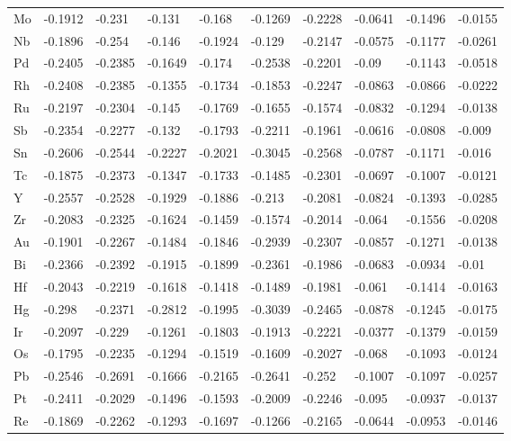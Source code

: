 \begin{table}[h]
{\begin{tabular}{*{10}{l}}
      Mo & -0.1912 & -0.231  & -0.131  & -0.168  & -0.1269 & -0.2228 & -0.0641 & -0.1496 & -0.0155 \\
      Nb & -0.1896 & -0.254  & -0.146  & -0.1924 & -0.129  & -0.2147 & -0.0575 & -0.1177 & -0.0261 \\
      Pd & -0.2405 & -0.2385 & -0.1649 & -0.174  & -0.2538 & -0.2201 & -0.09   & -0.1143 & -0.0518 \\
      Rh & -0.2408 & -0.2385 & -0.1355 & -0.1734 & -0.1853 & -0.2247 & -0.0863 & -0.0866 & -0.0222 \\
      Ru & -0.2197 & -0.2304 & -0.145  & -0.1769 & -0.1655 & -0.1574 & -0.0832 & -0.1294 & -0.0138 \\
      Sb & -0.2354 & -0.2277 & -0.132  & -0.1793 & -0.2211 & -0.1961 & -0.0616 & -0.0808 & -0.009  \\
      Sn & -0.2606 & -0.2544 & -0.2227 & -0.2021 & -0.3045 & -0.2568 & -0.0787 & -0.1171 & -0.016  \\
      Tc & -0.1875 & -0.2373 & -0.1347 & -0.1733 & -0.1485 & -0.2301 & -0.0697 & -0.1007 & -0.0121 \\
      Y  & -0.2557 & -0.2528 & -0.1929 & -0.1886 & -0.213  & -0.2081 & -0.0824 & -0.1393 & -0.0285 \\
      Zr & -0.2083 & -0.2325 & -0.1624 & -0.1459 & -0.1574 & -0.2014 & -0.064  & -0.1556 & -0.0208 \\
      Au & -0.1901 & -0.2267 & -0.1484 & -0.1846 & -0.2939 & -0.2307 & -0.0857 & -0.1271 & -0.0138 \\
      Bi & -0.2366 & -0.2392 & -0.1915 & -0.1899 & -0.2361 & -0.1986 & -0.0683 & -0.0934 & -0.01   \\
      Hf & -0.2043 & -0.2219 & -0.1618 & -0.1418 & -0.1489 & -0.1981 & -0.061  & -0.1414 & -0.0163 \\
      Hg & -0.298  & -0.2371 & -0.2812 & -0.1995 & -0.3039 & -0.2465 & -0.0878 & -0.1245 & -0.0175 \\
      Ir & -0.2097 & -0.229  & -0.1261 & -0.1803 & -0.1913 & -0.2221 & -0.0377 & -0.1379 & -0.0159 \\
      Os & -0.1795 & -0.2235 & -0.1294 & -0.1519 & -0.1609 & -0.2027 & -0.068  & -0.1093 & -0.0124 \\
      Pb & -0.2546 & -0.2691 & -0.1666 & -0.2165 & -0.2641 & -0.252  & -0.1007 & -0.1097 & -0.0257 \\
      Pt & -0.2411 & -0.2029 & -0.1496 & -0.1593 & -0.2009 & -0.2246 & -0.095  & -0.0937 & -0.0137 \\
      Re & -0.1869 & -0.2262 & -0.1293 & -0.1697 & -0.1266 & -0.2165 & -0.0644 & -0.0953 & -0.0146 \\

\end{tabular}}
\end{table}

